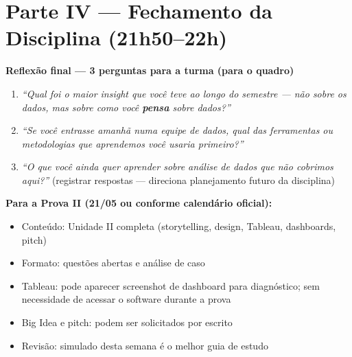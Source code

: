 \section{Parte IV — Fechamento da Disciplina (21h50–22h)}

\begin{BoardBox}
\textbf{Reflexão final — 3 perguntas para a turma (para o quadro)}

\begin{enumerate}
  \item \textit{``Qual foi o maior insight que você teve ao longo do semestre — não sobre
  os dados, mas sobre como você \textbf{pensa} sobre dados?''}
  \item \textit{``Se você entrasse amanhã numa equipe de dados, qual das ferramentas
  ou metodologias que aprendemos você usaria primeiro?''}
  \item \textit{``O que você ainda quer aprender sobre análise de dados que não cobrimos
  aqui?''} (registrar respostas — direciona planejamento futuro da disciplina)
\end{enumerate}
\end{BoardBox}

\begin{NoteBox}
\textbf{Para a Prova II (21/05 ou conforme calendário oficial):}
\begin{itemize}
  \item Conteúdo: Unidade II completa (storytelling, design, Tableau, dashboards, pitch)
  \item Formato: questões abertas e análise de caso
  \item Tableau: pode aparecer screenshot de dashboard para diagnóstico; sem necessidade
  de acessar o software durante a prova
  \item Big Idea e pitch: podem ser solicitados por escrito
  \item Revisão: simulado desta semana é o melhor guia de estudo
\end{itemize}
\end{NoteBox}

